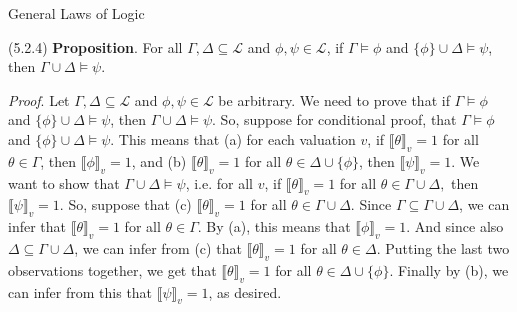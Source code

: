 \documentclass[../slides.tex]{subfiles}
\begin{document}
\begin{frame}{General Laws of Logic}

		(5.2.4) \textbf{Proposition}. For all $\Gamma,\Delta\subseteq\mathcal{L}$ and $\phi,\psi\in\mathcal{L}$, if $\Gamma\vDash\phi$ and $\{\phi\}\cup\Delta\vDash\psi$, then $\Gamma\cup\Delta\vDash\psi$.
		
		\vspace{2ex}
		
		\emph{Proof}. Let $\Gamma,\Delta\subseteq\mathcal{L}$ and $\phi,\psi\in\mathcal{L}$ be arbitrary. We need to prove that  if $\Gamma\vDash\phi$ and $\{\phi\}\cup\Delta\vDash\psi$, then $\Gamma\cup\Delta\vDash\psi$. So, suppose for conditional proof, that $\Gamma\vDash\phi$ and $\{\phi\}\cup\Delta\vDash\psi$. This means that (a) for each valuation $v$, if $\llbracket\theta\rrbracket_v=1$ for all $\theta\in\Gamma$, then $\llbracket \phi\rrbracket_v=1$, and (b) $\llbracket\theta\rrbracket_v=1$ for all $\theta\in\Delta\cup\{\phi\}$, then $\llbracket \psi\rrbracket_v=1$. We want to show that $\Gamma\cup\Delta\vDash\psi$, i.e. for all $v$, if $\llbracket \theta\rrbracket_v=1$ for all $\theta\in\Gamma\cup\Delta,$ then $\llbracket\psi\rrbracket_v=1$. So, suppose that (c) $\llbracket \theta\rrbracket_v=1$ for all $\theta\in\Gamma\cup\Delta$. Since $\Gamma\subseteq \Gamma\cup \Delta$, we can infer that $\llbracket \theta\rrbracket_v=1$ for all $\theta\in\Gamma$. By (a), this means that $\llbracket \phi\rrbracket_v=1$. And since also $\Delta\subseteq \Gamma\cup \Delta$, we can infer from (c) that $\llbracket \theta\rrbracket_v=1$ for all $\theta\in\Delta$. Putting the last two observations together, we get that $\llbracket\theta\rrbracket_v=1$ for all $\theta\in\Delta\cup\{\phi\}$. Finally by (b), we can infer from this that $\llbracket\psi\rrbracket_v=1$, as desired.
	

\end{frame}
\end{document}
